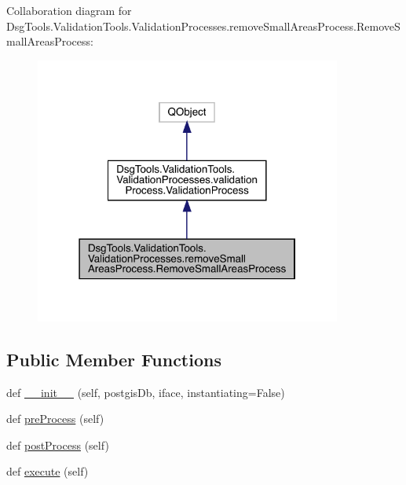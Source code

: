 Collaboration diagram for Dsg\+Tools.\+Validation\+Tools.\+Validation\+Processes.\+remove\+Small\+Areas\+Process.\+Remove\+Small\+Areas\+Process\+:
\nopagebreak
\begin{figure}[H]
\begin{center}
\leavevmode
\includegraphics[width=286pt]{class_dsg_tools_1_1_validation_tools_1_1_validation_processes_1_1remove_small_areas_process_1_1_e910e8999711547e206fa5490db2348b}
\end{center}
\end{figure}
\subsection*{Public Member Functions}
\begin{DoxyCompactItemize}
\item 
def \mbox{\hyperlink{class_dsg_tools_1_1_validation_tools_1_1_validation_processes_1_1remove_small_areas_process_1_1_remove_small_areas_process_aae7cd86d992d908b85eefb3f021e55cd}{\+\_\+\+\_\+init\+\_\+\+\_\+}} (self, postgis\+Db, iface, instantiating=False)
\item 
def \mbox{\hyperlink{class_dsg_tools_1_1_validation_tools_1_1_validation_processes_1_1remove_small_areas_process_1_1_remove_small_areas_process_a9097ae68e0988781aca0071460160568}{pre\+Process}} (self)
\item 
def \mbox{\hyperlink{class_dsg_tools_1_1_validation_tools_1_1_validation_processes_1_1remove_small_areas_process_1_1_remove_small_areas_process_ad1a85940df2da21d8776a32a8dee536a}{post\+Process}} (self)
\item 
def \mbox{\hyperlink{class_dsg_tools_1_1_validation_tools_1_1_validation_processes_1_1remove_small_areas_process_1_1_remove_small_areas_process_a601da9467854dbbbe6cf0704a4f3df2a}{execute}} (self)
\end{DoxyCompactItemize}
